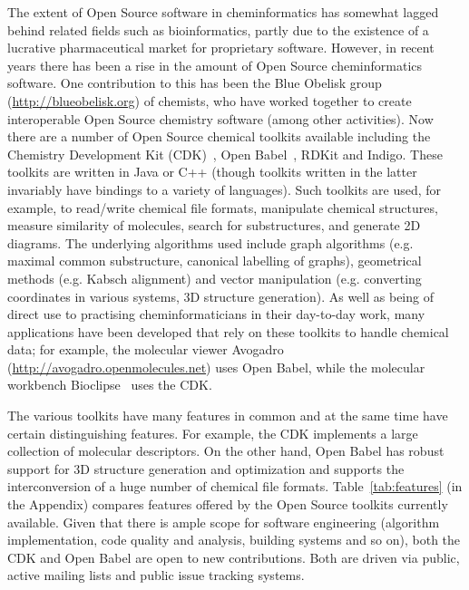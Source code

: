 \documentclass{sig-alternate}
\begin{document}
The extent of Open Source software in cheminformatics has somewhat
lagged behind related fields such as bioinformatics, partly due to the
existence of a lucrative pharmaceutical market for proprietary
software. However, in recent years there has been a rise in the amount
of Open Source cheminformatics software. One contribution to this has
been the Blue Obelisk group~\cite{BlueObelisk2011}
(\url{http://blueobelisk.org}) of chemists, who have worked together
to create interoperable Open Source chemistry software (among other
activities). Now there are a number of Open Source chemical toolkits
available including the Chemistry Development Kit
(CDK)~\cite{steinbeck2003}, Open Babel~\cite{openbabel2011}, RDKit and
Indigo. These toolkits are written in Java or C++ (though toolkits
written in the latter invariably have bindings to a variety of
languages). Such toolkits are used, for example, to read/write
chemical file formats, manipulate chemical structures, measure
similarity of molecules, search for substructures, and generate 2D
diagrams. The underlying algorithms used include graph algorithms
(e.g. maximal common substructure, canonical labelling of graphs),
geometrical methods (e.g. Kabsch alignment) and vector manipulation
(e.g. converting coordinates in various systems, 3D structure
generation). As well as being of direct use to practising
cheminformaticians in their day-to-day work, many applications have
been developed that rely on these toolkits to handle chemical data;
for example, the molecular viewer Avogadro
(\url{http://avogadro.openmolecules.net}) uses Open Babel, while the
molecular workbench Bioclipse~\cite{Bioclipse2} uses the CDK.

The various toolkits have many features in common and at the same time
have certain distinguishing features. For example, the CDK implements
a large collection of molecular descriptors. On the other hand, Open
Babel has robust support for 3D structure generation and optimization
and supports the interconversion of a huge number of chemical file
formats. Table~\ref{tab:features} (in the Appendix) compares features
offered by the Open Source toolkits currently available.  Given that
there is ample scope for software engineering (algorithm
implementation, code quality and analysis, building systems and so on), both
the CDK and Open Babel are open to new contributions. Both are driven
via public, active mailing lists and public issue tracking systems.
\end{document}
